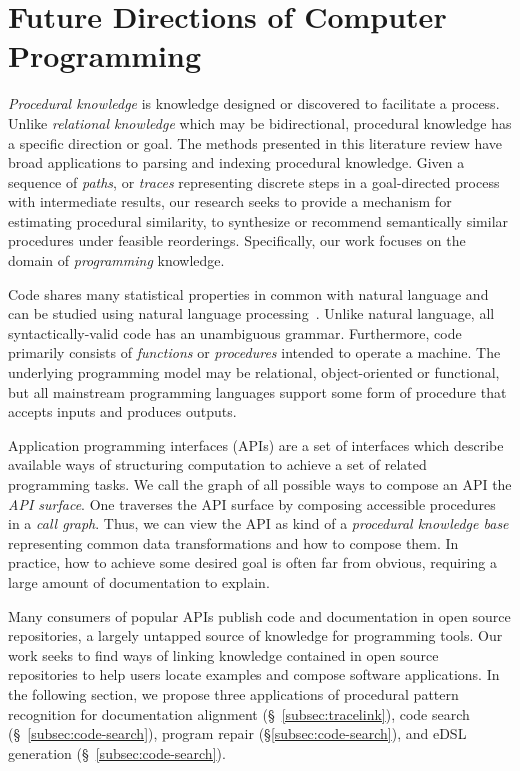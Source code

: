 \documentclass[10pt]{article}
\begin{document}
\noindent\section{Future Directions of Computer Programming}

\textit{Procedural knowledge} is knowledge designed or discovered to facilitate a process. Unlike \textit{relational knowledge} which may be bidirectional, procedural knowledge has a specific direction or goal. The methods presented in this literature review have broad applications to parsing and indexing procedural knowledge. Given a sequence of \textit{paths}, or \textit{traces} representing discrete steps in a goal-directed process with intermediate results, our research seeks to provide a mechanism for estimating procedural similarity, to synthesize or recommend semantically similar procedures under feasible reorderings. Specifically, our work focuses on the domain of \textit{programming} knowledge.

Code shares many statistical properties in common with natural language and can be studied using natural language processing~\cite{hindle2012naturalness}. Unlike natural language, all syntactically-valid code has an unambiguous grammar. Furthermore, code primarily consists of \textit{functions} or \textit{procedures} intended to operate a machine. The underlying programming model may be relational, object-oriented or functional, but all mainstream programming languages support some form of procedure that accepts inputs and produces outputs.


Application programming interfaces (APIs) are a set of interfaces which describe available ways of structuring computation to achieve a set of related programming tasks. We call the graph of all possible ways to compose an API the \textit{API surface}. One traverses the API surface by composing accessible procedures in a \textit{call graph}. Thus, we can view the API as kind of a \textit{procedural knowledge base} representing common data transformations and how to compose them. In practice, how to achieve some desired goal is often far from obvious, requiring a large amount of documentation to explain.

Many consumers of popular APIs publish code and documentation in open source repositories, a largely untapped source of knowledge for programming tools. Our work seeks to find ways of linking knowledge contained in open source repositories to help users locate examples and compose software applications. In the following section, we propose three applications of procedural pattern recognition for documentation alignment (\S~\ref{subsec:tracelink}), code search (\S~\ref{subsec:code-search}), program repair (\S\ref{subsec:code-search}), and eDSL generation (\S~\ref{subsec:code-search}).
\end{document}
